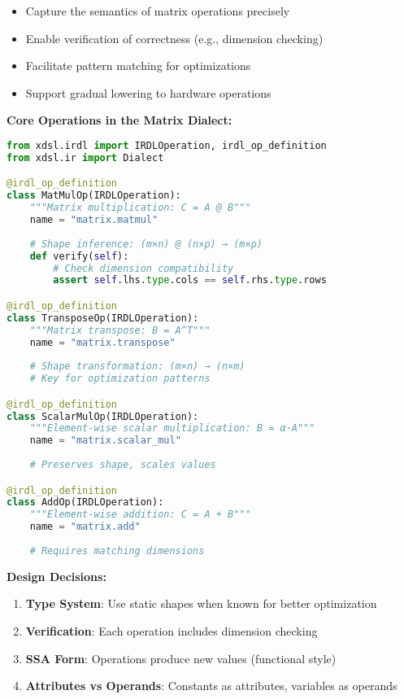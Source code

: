 \documentclass[11pt,a4paper]{article}
\begin{document}
\begin{itemize}
    \item Capture the semantics of matrix operations precisely
    \item Enable verification of correctness (e.g., dimension checking)
    \item Facilitate pattern matching for optimizations
    \item Support gradual lowering to hardware operations
\end{itemize}

\textbf{Core Operations in the Matrix Dialect:}

\begin{lstlisting}[language=Python, caption=Key dialect operations and their design]
from xdsl.irdl import IRDLOperation, irdl_op_definition
from xdsl.ir import Dialect

@irdl_op_definition
class MatMulOp(IRDLOperation):
    """Matrix multiplication: C = A @ B"""
    name = "matrix.matmul"
    
    # Shape inference: (m×n) @ (n×p) → (m×p)
    def verify(self):
        # Check dimension compatibility
        assert self.lhs.type.cols == self.rhs.type.rows

@irdl_op_definition
class TransposeOp(IRDLOperation):
    """Matrix transpose: B = A^T"""
    name = "matrix.transpose"
    
    # Shape transformation: (m×n) → (n×m)
    # Key for optimization patterns

@irdl_op_definition
class ScalarMulOp(IRDLOperation):
    """Element-wise scalar multiplication: B = α·A"""
    name = "matrix.scalar_mul"
    
    # Preserves shape, scales values

@irdl_op_definition
class AddOp(IRDLOperation):
    """Element-wise addition: C = A + B"""
    name = "matrix.add"
    
    # Requires matching dimensions
\end{lstlisting}

\textbf{Design Decisions:}
\begin{enumerate}
    \item \textbf{Type System}: Use static shapes when known for better optimization
    \item \textbf{Verification}: Each operation includes dimension checking
    \item \textbf{SSA Form}: Operations produce new values (functional style)
    \item \textbf{Attributes vs Operands}: Constants as attributes, variables as operands
\end{enumerate}
\end{document}
